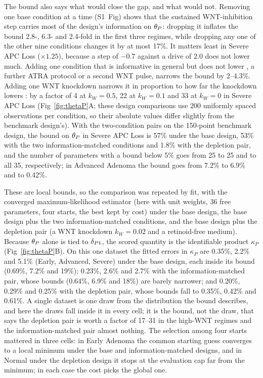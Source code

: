 The bound also says what would close the gap, and what would not. Removing one
base condition at a time (S1~Fig) shows that the sustained WNT-inhibition step
carries most of the design's information on $\theta_P$: dropping it inflates the
bound 2.8-, 6.3- and 2.4-fold in the first three regimes, while dropping any
one of the other nine conditions changes it by at most 17\%. It matters least in
Severe APC Loss ($\times1.25$), because a step of $-0.7$ against a drive of $2.0$ does not lower
\bcat{} much. Adding one condition that is informative in general but does not
lower \bcat{}, a further ATRA protocol or a second WNT pulse, narrows the bound
by 2--4.3\%. Adding one WNT knockdown narrows it in proportion to how far the
knockdown lowers \bcat{}: by a factor of 4 at $k_W=0.5$, 22 at $k_W=0.1$ and 33
at $k_W=0$ in Severe APC Loss (Fig~\ref{fig:thetaP}A; these design comparisons
use 200 uniformly spaced observations per condition, so their absolute values
differ slightly from the benchmark design's). With the two-condition pairs on the
150-point benchmark design, the bound on $\theta_P$ in Severe APC Loss is 57\% under
the base design, 53\% with the two information-matched conditions and 1.8\% with
the depletion pair, and the number of parameters with a bound below 5\% goes from
25 to 25 and to all 35, respectively; in Advanced Adenoma the bound goes from
7.2\% to 6.9\% and to 0.42\%.

These are local bounds, so the comparison was repeated by fit, with the converged maximum-likelihood estimator (here with unit weights, 36
free parameters, four starts, the best kept by cost) under the base design, the base design plus the
two information-matched conditions, and the base design plus the depletion pair
(a WNT knockdown $k_W=0.02$ and a retinoid-free medium). Because $\theta_P$ alone is
tied to $\delta_{P1}$, the scored quantity is the identifiable product $\kappa_P$
(Fig~\ref{fig:thetaP}B). On this one dataset the fitted errors in $\kappa_P$ are
0.35\%, 2.2\% and 5.1\% (Early, Advanced, Severe) under the base design, each
inside its bound (0.69\%, 7.2\% and 19\%); 0.23\%, 2.6\% and 2.7\% with the
information-matched pair, whose bounds (0.64\%, 6.9\% and 18\%) are barely
narrower; and 0.20\%, 0.29\% and 0.25\% with the depletion pair, whose bounds
fall to 0.35\%, 0.42\% and 0.61\%. A single dataset is one draw from the
distribution the bound describes, and here the draws fall inside it in every
cell; it is the bound, not the draw, that says the depletion pair is worth a
factor of 17--31 in the high-WNT regimes and the information-matched pair almost
nothing. The selection among four starts mattered in three cells: in Early Adenoma the
common starting guess converges to a local minimum under the base and
information-matched designs, and in Normal under the depletion design it stops at
the evaluation cap far from the minimum; in each case the cost picks the global
one.

